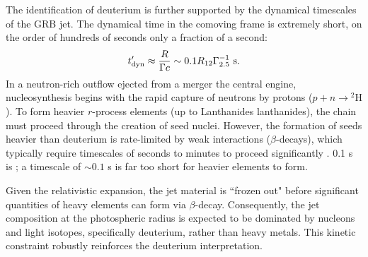 \documentclass[prd,twocolumn,amsmath,amssymb,aps,linenumbers]{revtex4-2} %
\providecommand{\DIFaddtex}[1]{{\protect\color{blue} \sf #1}} %
\providecommand{\DIFdeltex}[1]{{\protect\color{red} \scriptsize #1}} %
\providecommand{\DIFaddbegin}{} %
\providecommand{\DIFaddend}{} %
\providecommand{\DIFdelbegin}{} %
\providecommand{\DIFdelend}{} %
\providecommand{\DIFadd}[1]{\texorpdfstring{\DIFaddtex{#1}}{#1}} %
\providecommand{\DIFdel}[1]{\texorpdfstring{\DIFdeltex{#1}}{}} %
\newcommand{\DIFscaledelfig}{0.5}
\newlength{\DIFdelgraphicswidth} %
\newlength{\DIFdelgraphicsheight} %
\newcommand{\DIFaddincludegraphics}[2][]{{\color{blue}\fbox{\DIFOincludegraphics[#1]{#2}}}} %
\newcommand{\DIFdelincludegraphics}[2][]{%
\sbox{\DIFdelgraphicsbox}{\DIFOincludegraphics[#1]{#2}}%
\settoboxwidth{\DIFdelgraphicswidth}{\DIFdelgraphicsbox} %
\settoboxtotalheight{\DIFdelgraphicsheight}{\DIFdelgraphicsbox} %
\scalebox{\DIFscaledelfig}{%
\parbox[b]{\DIFdelgraphicswidth}{\usebox{\DIFdelgraphicsbox}\\[-\baselineskip] \rule{\DIFdelgraphicswidth}{0em}}\llap{\resizebox{\DIFdelgraphicswidth}{\DIFdelgraphicsheight}{%
\setlength{\unitlength}{\DIFdelgraphicswidth}%
\begin{picture}(1,1)%
\thicklines\linethickness{2pt} %
{\color[rgb]{1,0,0}\put(0,0){\framebox(1,1){}}}%
{\color[rgb]{1,0,0}\put(0,0){\line( 1,1){1}}}%
{\color[rgb]{1,0,0}\put(0,1){\line(1,-1){1}}}%
\end{picture}%
}\hspace*{3pt}}} %
} %
\DeclareRobustCommand{\DIFaddbegin}{\DIFOaddbegin \let\includegraphics\DIFaddincludegraphics} %
\DeclareRobustCommand{\DIFaddend}{\DIFOaddend \let\includegraphics\DIFOincludegraphics} %
\DeclareRobustCommand{\DIFdelbegin}{\DIFOdelbegin \let\includegraphics\DIFdelincludegraphics} %
\DeclareRobustCommand{\DIFdelend}{\DIFOaddend \let\includegraphics\DIFOincludegraphics} %
\begin{document}
The identification of deuterium is further supported by the dynamical timescales of the GRB jet. %
The dynamical time in the comoving frame is extremely short, \DIFdelbegin \DIFdel{on the order of hundreds of seconds}\DIFdelend \DIFaddbegin \DIFadd{only a fraction of a second}\DIFaddend :
\begin{equation}
t'_{\rm dyn} \approx \frac{R}{\Gamma c} \sim 0.1 R_{12} \Gamma_{2.5}^{-1} \text{ s}.
\end{equation}
In a neutron-rich outflow ejected from \DIFdelbegin \DIFdel{a merger}\DIFdelend \DIFaddbegin \DIFadd{the central engine}\DIFaddend , nucleosynthesis begins with the rapid capture of neutrons by protons ($p + n \rightarrow {^2\text{H}}$). To form heavier $r$-process elements (up to \DIFdelbegin \DIFdel{Lanthanides}\DIFdelend \DIFaddbegin \DIFadd{lanthanides}\DIFaddend ), the chain must proceed through the creation of seed nuclei. However, the formation of seeds heavier than deuterium is rate-limited by weak interactions ($\beta$-decays), which typically require timescales of seconds to minutes to proceed significantly\DIFdelbegin \DIFdel{. 0.1 s is }\DIFdelend \DIFaddbegin \DIFadd{; a timescale of $\sim0.1$ s is far }\DIFaddend too short for heavier elements to form. %

Given the relativistic expansion, the jet material is ``frozen out" before significant quantities of heavy elements can form via $\beta$-decay. Consequently, the jet composition at the photospheric radius is expected to be dominated by nucleons and light isotopes, specifically deuterium, rather than heavy metals. This kinetic constraint robustly %
reinforces the deuterium interpretation.
\end{document}
